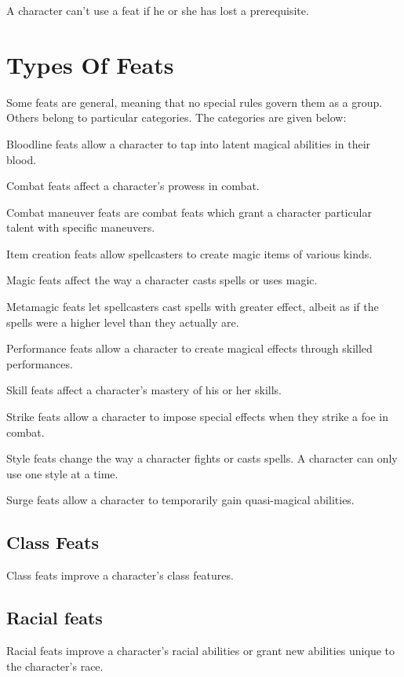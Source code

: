 A character can't use a feat if he or she has lost a prerequisite.

\section{Types Of Feats}
Some feats are general, meaning that no special rules govern
them as a group. Others belong to particular categories. The categories are given below:
\begin{itemize*}
    \item Bloodline feats allow a character to tap into latent magical abilities in their blood.
    \item Combat feats affect a character's prowess in combat.
    \item Combat maneuver feats are combat feats which grant a character particular talent with specific maneuvers.
    \item Item creation feats allow spellcasters to create magic items of various kinds.
    \item Magic feats affect the way a character casts spells or uses magic.
    \item Metamagic feats let spellcasters cast spells with greater effect, albeit as if the spells were a higher level than they actually are.
    \item Performance feats allow a character to create magical effects through skilled performances.
    \item Skill feats affect a character's mastery of his or her skills.
    \item Strike feats allow a character to impose special effects when they strike a foe in combat.
    \item Style feats change the way a character fights or casts spells. A character can only use one style at a time.
    \item Surge feats allow a character to temporarily gain quasi-magical abilities.
\end{itemize*}

\subsection{Class Feats}
Class feats improve a character's class features.

\subsection{Racial feats}
Racial feats improve a character's racial abilities or grant new abilities unique to the character's race.

